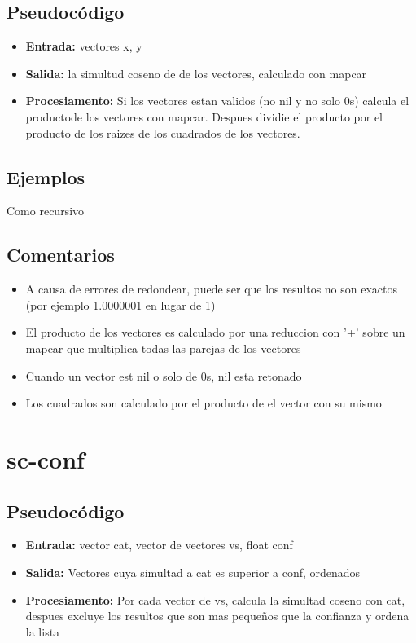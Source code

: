 \documentclass{article}
\begin{document}
\subsection{Pseudoc\'odigo}
\begin{itemize}
	\item \textbf{Entrada:} vectores x, y
	\item \textbf{Salida:} la simultud coseno de de los vectores, calculado con mapcar
	\item \textbf{Procesiamento:} Si los vectores estan validos (no nil y no solo 0s) calcula el productode los vectores con mapcar. Despues dividie el producto por el producto de los raizes de los cuadrados de los vectores.
\end{itemize}
\subsection{Ejemplos}
Como recursivo
\subsection{Comentarios}
\begin{itemize}
	\item A causa de errores de redondear, puede ser que los resultos no son exactos (por ejemplo 1.0000001 en lugar de 1)
	\item El producto de los vectores es calculado por una reduccion con '+' sobre un mapcar que multiplica todas las parejas de los vectores
	\item Cuando un vector est nil o solo de 0s, nil esta retonado
	\item Los cuadrados son calculado por el producto de el vector con su mismo
\end{itemize}
\section{sc-conf}
\subsection{Pseudoc\'odigo}
\begin{itemize}
	\item \textbf{Entrada:} vector cat, vector de vectores vs, float conf
	\item \textbf{Salida:} Vectores cuya simultad a cat es superior a conf, ordenados
	\item \textbf{Procesiamento:} Por cada vector de vs, calcula la simultad coseno con cat, despues excluye los resultos que son mas peque\~nos que la confianza y ordena la lista
\end{itemize}
\end{document}
